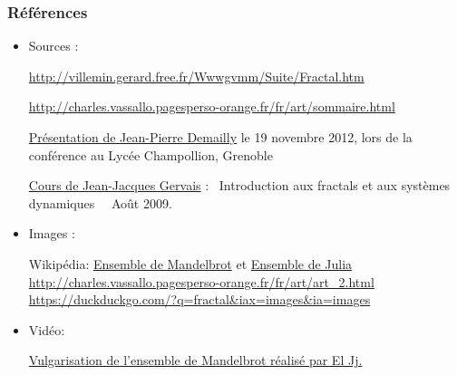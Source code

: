 \documentclass[aspectratio=1610]{beamer}
\begin{document}
\begin{frame}
\frametitle{Références}
\begin{itemize}
        \item Sources :

\url{http://villemin.gerard.free.fr/Wwwgvmm/Suite/Fractal.htm}

\url{http://charles.vassallo.pagesperso-orange.fr/fr/art/sommaire.html}

\vspace{0.5cm}

\href{https://www-fourier.ujf-grenoble.fr/~demailly/manuscripts/fractales-print.pdf}{Présentation de Jean-Pierre Demailly}
         le 19 novembre 2012, lors de la conférence au Lycée Champollion, Grenoble
\vspace{0.5cm}

\href{https://www2.mat.ulaval.ca/fileadmin/Cours/MAT-2430/Notes_de_cours/NotesDeCours.pdf}{Cours de Jean-Jacques Gervais}
         : \guillemotleft \ Introduction aux fractals et aux systèmes dynamiques \ \guillemotright \ Août 2009.

\vspace{0.5cm}

        \item Images :

Wikipédia: \href{https://fr.wikipedia.org/wiki/Ensemble_de_Mandelbrot}{Ensemble de Mandelbrot} et \href{https://fr.wikipedia.org/wiki/Ensemble_de_Julia}{Ensemble de Julia}
\url{http://charles.vassallo.pagesperso-orange.fr/fr/art/art_2.html}
\url{https://duckduckgo.com/?q=fractal&iax=images&ia=images}
        \item Vidéo:

\href{https://www.youtube.com/watch?v=Y4ICbYtBGzA}{Vulgarisation de l'ensemble de Mandelbrot réalisé par El Jj.}

\end{itemize}    

\end{frame}
\end{document}
